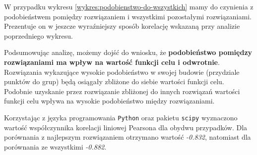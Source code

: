 \documentclass[main.tex]{subfiles}
\begin{document}
W przypadku wykresu \ref{wykres:podobienstwo-do-wszystkich} mamy do czynienia z podobieństwem pomiędzy rozwiązaniem i wszystkimi pozostałymi rozwiązaniami. Prezentuje on w jeszcze wyraźniejszy sposób korelację wskazaną przy analizie poprzedniego wykresu.

Podsumowując analizę, możemy dojść do wniosku, że \textbf{podobieństwo pomiędzy rozwiązaniami ma wpływ na wartość funkcji celu i odwrotnie}. Rozwiązania wykazujące wysokie podobieństwo w swojej budowie (przydziale punktów do grup) będą osiągały zbliżone do siebie wartości funkcji celu. Podobnie uzyskanie przez rozwiązanie zbliżonej do innych rozwiązań wartości funkcji celu wpływa na wysokie podobieństwo między rozwiązaniami.

Korzystając z języka programowania \texttt{Python} oraz pakietu \texttt{scipy} wyznaczono wartość współczynnika korelacji liniowej Pearsona dla obydwu przypadków. Dla porównania z najlepszym rozwiązaniem otrzymano wartość \textit{-0.832}, natomiast dla porównania ze wszystkimi \textit{-0.882}.
\end{document}
